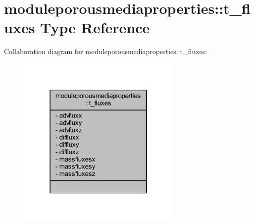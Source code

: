 \hypertarget{structmoduleporousmediaproperties_1_1t__fluxes}{}\section{moduleporousmediaproperties\+:\+:t\+\_\+fluxes Type Reference}
\label{structmoduleporousmediaproperties_1_1t__fluxes}


Collaboration diagram for moduleporousmediaproperties\+:\+:t\+\_\+fluxes\+:\nopagebreak
\begin{figure}[H]
\begin{center}
\leavevmode
\includegraphics[width=226pt]{structmoduleporousmediaproperties_1_1t__fluxes__coll__graph}
\end{center}
\end{figure}
